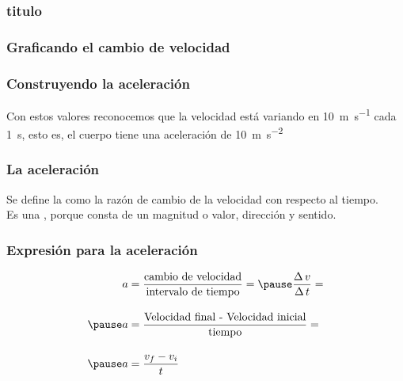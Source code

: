 \documentclass[14pt]{beamer}
\begin{document}
\begin{frame}
\frametitle{titulo}
\frametitle{Graficando el cambio de velocidad}
\begin{figure}
    \centering
\end{figure}
\end{frame}
\begin{frame}
\frametitle{Construyendo la aceleración}
Con estos valores reconocemos que la velocidad está variando en \SI{10}{\meter\per\second} cada \SI{1}{\second}, \pause esto es, el cuerpo tiene una aceleración de \SI{10}{\meter\per\square\second}
\end{frame}
\begin{frame}
\frametitle{La aceleración}
Se define la  \pause como la razón de cambio de la velocidad con respecto al tiempo.
\\
\bigskip
\pause
Es una , porque consta de un magnitud o valor, dirección y sentido.
\end{frame}
\begin{frame}
\frametitle{Expresión para la aceleración}
\begin{eqnarray*}
\begin{aligned}
a &= \dfrac{\text{cambio de velocidad}}{\text{intervalo de tiempo}} = \pause \dfrac{\Delta \, v}{\Delta \, t} = \\[1em] \pause
a &= \dfrac{\text{Velocidad final - Velocidad inicial}}{\text{tiempo}} = \\[1em] \pause
a &= \dfrac{v_{f} - v_{i}}{t}
\end{aligned}
\end{eqnarray*}
\end{frame}
\end{document}
